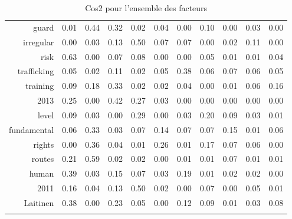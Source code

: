 \begin{longtable}{rrrrrrrrrrr}
  guard & 0.01 & 0.44 & 0.32 & 0.02 & 0.04 & 0.00 & 0.10 & 0.00 & 0.03 & 0.00 \\ 
  irregular & 0.00 & 0.03 & 0.13 & 0.50 & 0.07 & 0.07 & 0.00 & 0.02 & 0.11 & 0.00 \\ 
  risk & 0.63 & 0.00 & 0.07 & 0.08 & 0.00 & 0.00 & 0.05 & 0.01 & 0.01 & 0.04 \\ 
  trafficking & 0.05 & 0.02 & 0.11 & 0.02 & 0.05 & 0.38 & 0.06 & 0.07 & 0.06 & 0.05 \\ 
  training & 0.09 & 0.18 & 0.33 & 0.02 & 0.02 & 0.04 & 0.00 & 0.01 & 0.06 & 0.16 \\ 
  2013 & 0.25 & 0.00 & 0.42 & 0.27 & 0.03 & 0.00 & 0.00 & 0.00 & 0.00 & 0.00 \\ 
  level & 0.09 & 0.03 & 0.00 & 0.29 & 0.00 & 0.03 & 0.20 & 0.09 & 0.03 & 0.01 \\ 
  fundamental & 0.06 & 0.33 & 0.03 & 0.07 & 0.14 & 0.07 & 0.07 & 0.15 & 0.01 & 0.06 \\ 
  rights & 0.00 & 0.36 & 0.04 & 0.01 & 0.26 & 0.01 & 0.17 & 0.07 & 0.06 & 0.00 \\ 
  routes & 0.21 & 0.59 & 0.02 & 0.02 & 0.00 & 0.01 & 0.01 & 0.07 & 0.01 & 0.01 \\ 
  human & 0.39 & 0.03 & 0.15 & 0.07 & 0.03 & 0.19 & 0.01 & 0.02 & 0.02 & 0.00 \\ 
  2011 & 0.16 & 0.04 & 0.13 & 0.50 & 0.02 & 0.00 & 0.07 & 0.00 & 0.05 & 0.01 \\ 
  Laitinen & 0.38 & 0.00 & 0.23 & 0.05 & 0.00 & 0.12 & 0.09 & 0.01 & 0.03 & 0.08 \\ 
   \hline
\hline
\caption{Cos2 pour l'ensemble des facteurs} 
\end{longtable}
